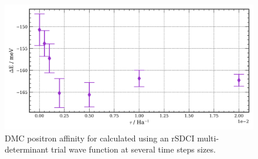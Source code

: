 \begin{figure}
    \caption{\label{fig:be_e_diff_ts} DMC positron affinity for  calculated using an rSDCI multi-determinant trial wave function at several time steps sizes. }
    \includegraphics[width=\columnwidth,keepaspectratio]{Images/chapter5/be_rSDCI_multidet.png}
\end{figure}



